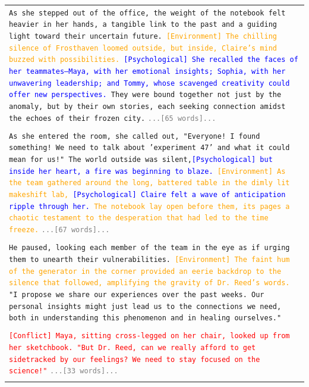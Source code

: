 \documentclass[letterpaper]{article} %
\begin{document}
\begin{small}
\begin{longtable}{p{\textwidth}}
    \texttt{As she stepped out of the office, the weight of the notebook felt heavier in her hands, a tangible link to the past and a guiding light toward their uncertain future. \textcolor{orange}{[Environment] The chilling silence of Frosthaven loomed outside, but inside, Claire's mind buzzed with possibilities.} \textcolor{blue}{[Psychological] She recalled the faces of her teammates—Maya, with her emotional insights; Sophia, with her unwavering leadership; and Tommy, whose scavenged creativity could offer new perspectives.} They were bound together not just by the anomaly, but by their own stories, each seeking connection amidst the echoes of their frozen city.}
    \texttt{\textcolor{gray}{...[65 words]...}} \\\\

    \texttt{As she entered the room, she called out, "Everyone! I found something! We need to talk about 'experiment 47' and what it could mean for us!" The world outside was silent,\textcolor{blue}{[Psychological] but inside her heart, a fire was beginning to blaze.} \textcolor{orange}{[Environment] As the team gathered around the long, battered table in the dimly lit makeshift lab, \textcolor{blue}{[Psychological] Claire felt a wave of anticipation ripple through her.} The notebook lay open before them, its pages a chaotic testament to the desperation that had led to the time freeze.}}
    \texttt{\textcolor{gray}{...[67 words]...}} \\\\

    \texttt{He paused, looking each member of the team in the eye as if urging them to unearth their vulnerabilities. \textcolor{orange}{[Environment] The faint hum of the generator in the corner provided an eerie backdrop to the silence that followed, amplifying the gravity of Dr. Reed's words.} "I propose we share our experiences over the past weeks. Our personal insights might just lead us to the connections we need, both in understanding this phenomenon and in healing ourselves."} \\\\

    \texttt{\textcolor{red}{[Conflict] Maya, sitting cross-legged on her chair, looked up from her sketchbook. "But Dr. Reed, can we really afford to get sidetracked by our feelings? We need to stay focused on the science!"}}
    \texttt{\textcolor{gray}{...[33 words]...}} \\\\


\end{longtable}
\end{small}
\end{document}
